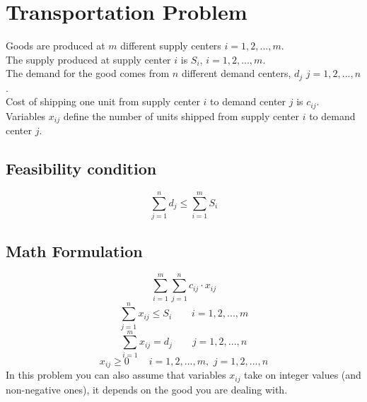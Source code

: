 \documentclass[a4paper,12pt,titlepage]{article}
\begin{document}
\section*{Transportation Problem}
Goods are produced at $m$ different supply centers $i=1,2,...,m$.\\
The supply produced at supply center $i$ is $S_i$, $i=1,2,...,m$.\\
The demand for the good comes from $n$ different demand centers, $d_j$ $j=1,2,...,n$.\\
Cost of shipping one unit from supply center $i$ to demand center $j$ is $c_{ij}$.\\
Variables $x_{ij}$ define the number of units shipped from supply center $i$ to demand center $j$.
\subsection*{Feasibility condition}
\begin{equation*}
\sum_{j=1}^{n} d_j \leq \sum_{i=1}^{m} S_i
\end{equation*}
\subsection*{Math Formulation}
\begin{equation}
\sum_{i=1}^{m}\sum_{j=1}^{n} c_{ij} \cdot x_{ij}
\tag{1}
\end{equation}
\begin{equation}
\sum_{j=1}^{n} x_{ij} \leq S_i \qquad i=1,2,...,m
\tag{2}
\end{equation}
\begin{equation}
\sum_{i=1}^{m}x_{ij} = d_j \qquad j=1,2,...,n
\tag{3}
\end{equation}
\begin{equation}
x_{ij} \geq 0 \qquad i=1,2,...,m,\,\, j=1,2,...,n
\tag{4}
\end{equation}
In this problem you can also assume that variables $x_{ij}$ take on integer
values (and non-negative ones), it depends on the good you are dealing with.
\end{document}
